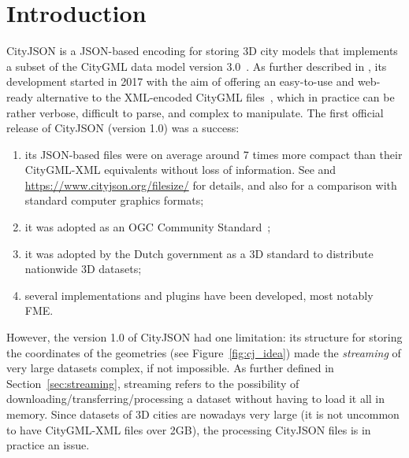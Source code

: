 \documentclass{isprs} %
\begin{document}
\maketitle


\sloppy


%
\section{Introduction}%
\label{sec:intro}
 
CityJSON is a JSON-based encoding for storing 3D city models that implements a subset of the CityGML data model version 3.0~\citep{OGC-CityGML3}.
As further described in \citet{19_ogdss_cityjson}, its development started in 2017 with the aim of offering an easy-to-use and web-ready alternative to the XML-encoded CityGML files~\citep{OGC-CityGML3-XML}, which in practice can be rather verbose, difficult to parse, and complex to manipulate.
The first official release of CityJSON (version 1.0) was a success: 
\begin{enumerate}
  \item its JSON-based files were on average around 7 times more compact than their CityGML-XML equivalents without loss of information. See \citet{19_ogdss_cityjson} and \url{https://www.cityjson.org/filesize/} for details, and also \citet{Praschl23} for a comparison with standard computer graphics formats; 
  \item it was adopted as an OGC Community Standard~\citep{OGC-CityJSON-v10}; 
  \item it was adopted by the Dutch government as a 3D standard to distribute nationwide 3D datasets; 
  \item several implementations and plugins have been developed, most notably FME\@.
\end{enumerate}



%

However, the version 1.0 of CityJSON had one limitation: its structure for storing the coordinates of the geometries (see Figure~\ref{fig:cj_idea}) made the \emph{streaming} of very large datasets complex, if not impossible.
As further defined in Section~\ref{sec:streaming}, streaming refers to the possibility of downloading/transferring/processing a dataset without having to load it all in memory.
Since datasets of 3D cities are nowadays very large (it is not uncommon to have CityGML-XML files over 2GB), the processing CityJSON files is in practice an issue.
\end{document}

